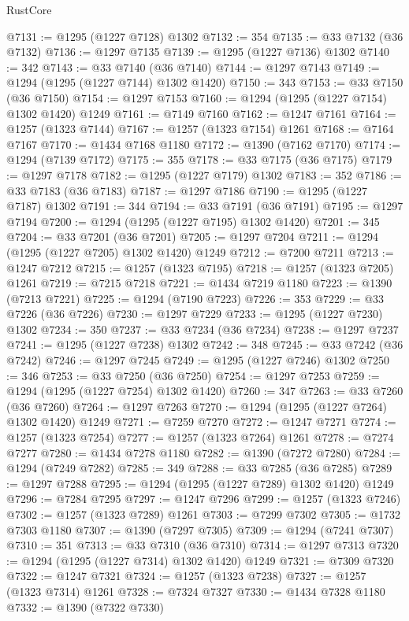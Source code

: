 \begin{lexlean}{RustCore}
\begin{coremodule}
@7131 := @1295 (@1227 @7128) @1302
@7132 := 354
@7135 := @33 @7132 (@36 @7132)
@7136 := @1297 @7135
@7139 := @1295 (@1227 @7136) @1302
@7140 := 342
@7143 := @33 @7140 (@36 @7140)
@7144 := @1297 @7143
@7149 := @1294 (@1295 (@1227 @7144) @1302 @1420)
@7150 := 343
@7153 := @33 @7150 (@36 @7150)
@7154 := @1297 @7153
@7160 := @1294 (@1295 (@1227 @7154) @1302 @1420) @1249
@7161 := @7149 @7160
@7162 := @1247 @7161
@7164 := @1257 (@1323 @7144)
@7167 := @1257 (@1323 @7154) @1261
@7168 := @7164 @7167
@7170 := @1434 @7168 @1180
@7172 := @1390 (@7162 @7170)
@7174 := @1294 (@7139 @7172)
@7175 := 355
@7178 := @33 @7175 (@36 @7175)
@7179 := @1297 @7178
@7182 := @1295 (@1227 @7179) @1302
@7183 := 352
@7186 := @33 @7183 (@36 @7183)
@7187 := @1297 @7186
@7190 := @1295 (@1227 @7187) @1302
@7191 := 344
@7194 := @33 @7191 (@36 @7191)
@7195 := @1297 @7194
@7200 := @1294 (@1295 (@1227 @7195) @1302 @1420)
@7201 := 345
@7204 := @33 @7201 (@36 @7201)
@7205 := @1297 @7204
@7211 := @1294 (@1295 (@1227 @7205) @1302 @1420) @1249
@7212 := @7200 @7211
@7213 := @1247 @7212
@7215 := @1257 (@1323 @7195)
@7218 := @1257 (@1323 @7205) @1261
@7219 := @7215 @7218
@7221 := @1434 @7219 @1180
@7223 := @1390 (@7213 @7221)
@7225 := @1294 (@7190 @7223)
@7226 := 353
@7229 := @33 @7226 (@36 @7226)
@7230 := @1297 @7229
@7233 := @1295 (@1227 @7230) @1302
@7234 := 350
@7237 := @33 @7234 (@36 @7234)
@7238 := @1297 @7237
@7241 := @1295 (@1227 @7238) @1302
@7242 := 348
@7245 := @33 @7242 (@36 @7242)
@7246 := @1297 @7245
@7249 := @1295 (@1227 @7246) @1302
@7250 := 346
@7253 := @33 @7250 (@36 @7250)
@7254 := @1297 @7253
@7259 := @1294 (@1295 (@1227 @7254) @1302 @1420)
@7260 := 347
@7263 := @33 @7260 (@36 @7260)
@7264 := @1297 @7263
@7270 := @1294 (@1295 (@1227 @7264) @1302 @1420) @1249
@7271 := @7259 @7270
@7272 := @1247 @7271
@7274 := @1257 (@1323 @7254)
@7277 := @1257 (@1323 @7264) @1261
@7278 := @7274 @7277
@7280 := @1434 @7278 @1180
@7282 := @1390 (@7272 @7280)
@7284 := @1294 (@7249 @7282)
@7285 := 349
@7288 := @33 @7285 (@36 @7285)
@7289 := @1297 @7288
@7295 := @1294 (@1295 (@1227 @7289) @1302 @1420) @1249
@7296 := @7284 @7295
@7297 := @1247 @7296
@7299 := @1257 (@1323 @7246)
@7302 := @1257 (@1323 @7289) @1261
@7303 := @7299 @7302
@7305 := @1732 @7303 @1180
@7307 := @1390 (@7297 @7305)
@7309 := @1294 (@7241 @7307)
@7310 := 351
@7313 := @33 @7310 (@36 @7310)
@7314 := @1297 @7313
@7320 := @1294 (@1295 (@1227 @7314) @1302 @1420) @1249
@7321 := @7309 @7320
@7322 := @1247 @7321
@7324 := @1257 (@1323 @7238)
@7327 := @1257 (@1323 @7314) @1261
@7328 := @7324 @7327
@7330 := @1434 @7328 @1180
@7332 := @1390 (@7322 @7330)

\end{coremodule}
\end{lexlean}
